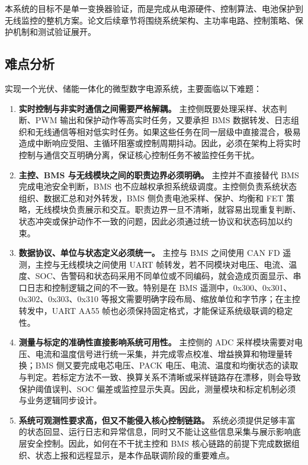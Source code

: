 本系统的目标不是单一变换器验证，而是完成从电源硬件、控制算法、电池保护到无线监控的整机方案。论文后续章节将围绕系统架构、主功率电路、控制策略、保护机制和测试验证展开。

\subsection{难点分析}

实现一个光伏、储能一体化的微型数字电源系统，主要面临以下难题：

\begin{enumerate}[label=\arabic*、, leftmargin=*, itemsep=0.8ex, parsep=0pt, topsep=0.5ex]
  \item \textbf{实时控制与非实时通信之间需要严格解耦。}  
  主控侧既要处理采样、状态判断、PWM 输出和保护动作等高实时任务，又要承担 BMS 数据转发、日志组织和无线通信等相对低实时任务。如果这些任务在同一层级中直接混合，极易造成中断响应受阻、主循环阻塞或控制周期抖动。因此，必须在架构上将实时控制与通信交互明确分离，保证核心控制任务不被监控任务干扰。

  \item \textbf{主控、BMS 与无线模块之间的职责边界必须明确。}  
  主控并不直接替代 BMS 完成电池安全判断，BMS 也不应越权承担系统级调度。主控侧负责系统状态组织、数据汇总和对外转发，BMS 侧负责电池采样、保护、均衡和 FET 策略，无线模块负责展示和交互。职责边界一旦不清晰，就容易出现重复判断、状态冲突或保护动作不一致的问题，因此必须通过统一协议和状态码加以约束。

  \item \textbf{数据协议、单位与状态定义必须统一。}  
  主控与 BMS 之间使用 CAN FD 遥测，主控与无线模块之间使用 UART 帧转发，若不同模块对电压、电流、温度、SOC、告警码和状态码采用不同单位或不同编码，就会造成页面显示、串口日志和控制逻辑之间的不一致。特别是在 BMS 遥测中，0x300、0x301、0x302、0x303、0x310 等报文需要明确字段布局、缩放单位和字节序；在主控转发中，UART AA55 帧也必须保持固定格式，才能保证系统级联调的稳定性。

  \item \textbf{测量与标定的准确性直接影响系统可用性。}  
  主控侧的 ADC 采样模块需要对电压、电流和温度信号进行统一采集，并完成零点校准、增益换算和物理量转换；BMS 侧又要完成电芯电压、PACK 电压、电流、温度和均衡状态的读取与判定。若标定方法不一致、换算关系不清晰或采样链路存在漂移，则会导致保护阈值误判、SOC 偏差或监控显示失真。因此，测量模块和标定机制必须与业务逻辑同步设计。

  \item \textbf{系统可观测性要求高，但又不能侵入核心控制链路。}  
  系统必须提供足够丰富的状态回显、运行日志和异常信息，同时又不能让这些信息采集与展示影响底层安全控制。因此，如何在不干扰主控和 BMS 核心链路的前提下完成数据组织、状态上报和远程显示，是本作品联调阶段的重要难点。


\end{enumerate}
